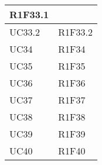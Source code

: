 \begin{center}
\begin{longtable}{|p{44mm}|p{22mm}|}
R1F33.1 \newline
\\
\hline
UC33.2 &

R1F33.2 \newline
\\
\hline
UC34 &

R1F34 \newline
\\
\hline
UC35 &

R1F35 \newline
\\
\hline
UC36 &

R1F36 \newline
\\
\hline
UC37 &

R1F37 \newline
\\
\hline
UC38 &

R1F38 \newline
\\
\hline
UC39 &

R1F39 \newline
\\
\hline
UC40 &

R1F40 \newline
\\
\hline%

	\end{longtable}
\end{center}

